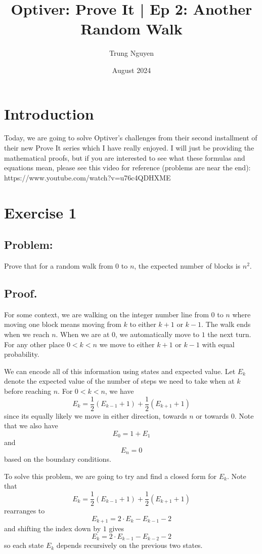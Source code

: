 \documentclass{article}
\title{Optiver: Prove It | Ep 2: Another Random Walk}
\author{Trung Nguyen}
\date{August 2024}
\begin{document}
\maketitle

\section{Introduction}

Today, we are going to solve Optiver's challenges from their second installment of their new Prove It series which I have really enjoyed. I will just be providing the mathematical proofs, but if you are interested to see what these formulas and equations mean, please see this video for reference (problems are near the end): https://www.youtube.com/watch?v=u76c4QDHXME 

\section{Exercise 1}

\subsection{Problem:}
Prove that for a random walk from $0$ to $n$, the expected number of blocks is $n^2$. 

\subsection{Proof.} 
For some context, we are walking on the integer number line from $0$ to $n$ where moving one block means moving from $k$ to either $k+1$ or $k-1$. The walk ends when we reach $n$. When we are at $0$, we automatically move to $1$ the next turn. For any other place $0<k<n$ we move to either $k+1$ or $k-1$ with equal probability. 

We can encode all of this information using states and expected value. Let $E_k$ denote the expected value of the number of steps we need to take when at $k$ before reaching $n$. For $0<k<n$, we have $$E_k=\frac{1}{2}(E_{k-1}+1)+\frac{1}{2}(E_{k+1}+1)$$ since its equally likely we move in either direction, towards $n$ or towards $0$. Note that we also have $$E_0=1+E_1$$ and $$E_n=0$$ based on the boundary conditions. 

To solve this problem, we are going to try and find a closed form for $E_k$. Note that $$E_k=\frac{1}{2}(E_{k-1}+1)+\frac{1}{2}(E_{k+1}+1)$$ rearranges to $$E_{k+1}=2\cdot E_k-E_{k-1}-2$$ and shifting the index down by $1$ gives $$E_{k}=2\cdot E_{k-1}-E_{k-2}-2$$ so each state $E_k$ depends recursively on the previous two states. 
\end{document}
